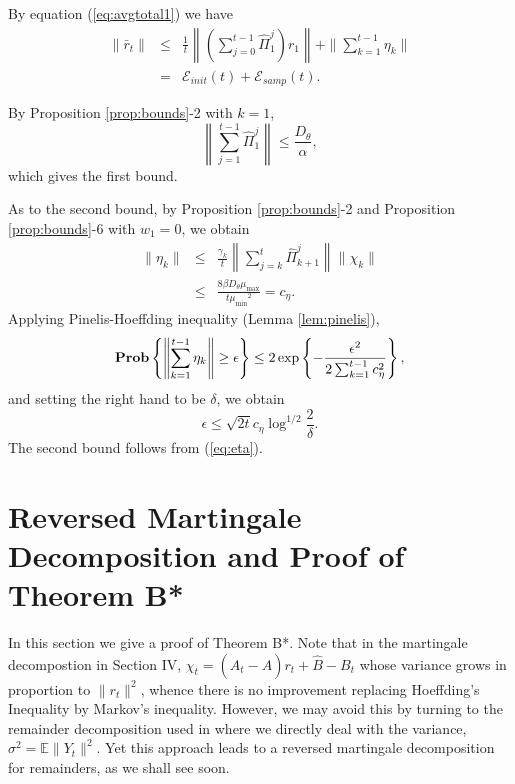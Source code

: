 \documentclass[twoside,twocolumn,journal]{IEEEtran}
\newenvironment{pf}[1][Proof]{\medskip\noindent\hspace{1em}{\itshape #1: }}{\hspace*{\fill}~\QED\par\endtrivlist\medskip}
\def\E{{\mathbb E}}        %
\def\Err{{\mathscr E}}
\def\Prob{{\bf Prob}}
\def\amax{{\mu_{\max}}}
\def\amin{{\mu_{\min}} }
\begin{document}
\begin{pf}[Proof of Theorem 3.2] By equation (\ref{eq:avgtotal1}) we have
\begin{eqnarray*}
\|\bar{r}_{t}\| & \leq & \frac{1}{t}\left\|\left(\sum_{j=0}^{t-1} \hat{\Pi}_1^j \right) r_1\right\| + \|\sum_{k=1}^{t-1}\eta_k\| \\
& = & \Err_{init}(t) + \Err_{samp}(t).
\end{eqnarray*}

By Proposition \ref{prop:bounds}-2 with $k=1$,
\[ \left\|\sum_{j=1}^{t-1} \hat{\Pi}_1^j \right\| \leq \frac{D_\theta}{\alpha}, \]
which gives the first bound.

As to the second bound, by Proposition \ref{prop:bounds}-2 and Proposition \ref{prop:bounds}-6 with $w_1=0$, we obtain
\begin{eqnarray}
\|\eta_k\| & \leq & \frac{\gamma_k}{t} \left\| \sum_{j=k}^{t} \hat{\Pi}_{k+1}^j \right\| \|\chi_k\| \nonumber \\
& \leq & \frac{8 \beta D_\theta \amax}{t \amin^2} = c_\eta. \label{eq:eta}
\end{eqnarray}
Applying Pinelis-Hoeffding inequality (Lemma \ref{lem:pinelis}),
\[ \Prob \left\{ \left\|\sum_{k=1}^{t-1} \eta_k \right\| \geq \epsilon \right\} \leq
2 \exp \left\{-\frac{\epsilon^2}{2\sum_{k=1}^{t-1} c_\eta^2} \right\},  \]
and setting the right hand to be $\delta$, we obtain
\[ \epsilon \leq  \sqrt{2t} c_\eta \log^{1/2} \frac{2}{\delta}.\]
The second bound follows from (\ref{eq:eta}).
\end{pf}


\section{Reversed Martingale Decomposition and Proof of Theorem B*}


In this section we give a proof of Theorem B*. Note that in the martingale decompostion in Section IV,
$\chi_t=(A_t - \hat{A})r_t + \hat{B}-B_t$ whose variance grows in proportion to $\|r_t\|^2$, whence there is no improvement
replacing Hoeffding's Inequality by Markov's inequality.
However, we may avoid this by turning to the remainder decomposition used in \cite{SmaYao04} where we directly deal with the variance,
$\sigma^2=\E\|Y_t\|^2$. Yet this approach leads to a reversed martingale decomposition for remainders, as we shall see soon.
\end{document}
